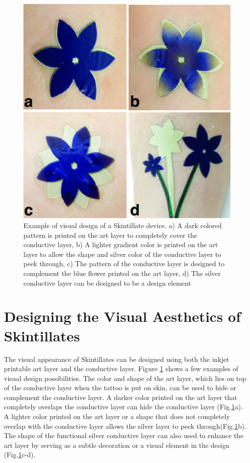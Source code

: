 \documentclass{sigchi}
\begin{document}
\begin{figure}[!h]
\centering
\includegraphics[width=0.8\columnwidth]{figures/Figure5}
\caption{Example of visual design of a Skintillate device. a) A dark colored pattern is printed on the art layer to completely cover the conductive layer, b) A lighter gradient color is printed on the art layer to allow the shape and silver color of the conductive layer to peek through, c) The pattern of the conductive layer is designed to complement the blue flower printed on the art layer, d) The silver conductive layer can be designed to be a design element}
\vspace{-8pt}
\label{fig:design}
\end{figure}
\section{Designing the Visual Aesthetics of Skintillates}
The visual appearance of Skintillates can be designed using both the inkjet printable art layer and the conductive layer. Figure \ref{fig:design} shows a few examples of visual design possibilities. The color and shape of the art layer, which lies on top of the conductive layer when the tattoo is put on skin, can be used to hide or complement the conductive layer. A darker color printed on the art layer that completely overlaps the conductive layer can hide the conductive layer (Fig.\ref{fig:design}a). A lighter color printed on the art layer or a shape that does not completely overlap with the conductive layer allows the silver layer to peek through(Fig.\ref{fig:design}b). The shape of the functional silver conductive layer can also used to enhance the art layer by serving as a subtle decoration or a visual element in the design (Fig.\ref{fig:design}c-d). 
\end{document}
